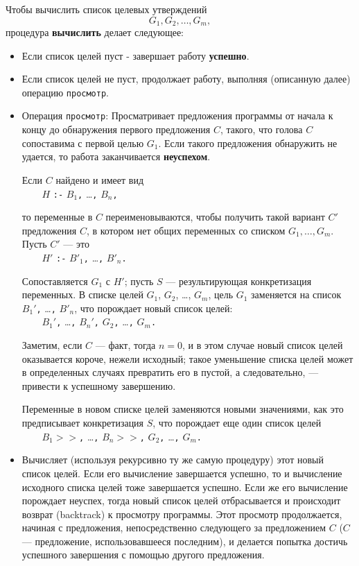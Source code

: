 \documentclass[12pt, openany, twoside]{book} %
\begin{document}
Чтобы вычислить список целевых утверждений
$$
    G_1, G_2, \ldots, G_m,
$$
процедура \textbf{вычислить} делает следующее:
\begin{itemize}
  \item Если список целей пуст - завершает работу \textbf{успешно}.
  \item Если список целей не пуст, продолжает работу, выполняя (описанную далее) операцию {\tt просмотр}.
  \item Операция \texttt{просмотр}: Просматривает предложения программы от начала к концу до обнаружения первого предложения $C$, такого, что голова $C$ сопоставима с первой целью $G_1$. Если такого предложения обнаружить не удается, то работа заканчивается \textbf{неуспехом}.

\noindent Если $C$ найдено и имеет вид\\[1ex]
\verb|    |$H$ {\tt :-} $B_1${\tt,} \ldots{\tt,} $B_n${\tt,}

\noindent то переменные в $C$ переименовываются, чтобы получить такой вариант $C'$ предложения $C$, в котором нет общих переменных со списком $G_1, \ldots, G_m$. Пусть $C'$ --- это\\[1ex]
\verb|    |$H'$ {\tt :-} $B'_1${\tt,} \ldots{\tt,} $B'_n${\tt.}

\noindent Сопоставляется $G_1$ с $H'$; пусть $S$ --- результирующая конкретизация переменных. В списке целей $G_1$, $G_2$, \ldots, $G_m$, цель $G_1$ заменяется на список $B_1'${\tt,} \ldots{\tt,} $B'_n$, что порождает новый список
целей:\\[1ex]
\verb|    |$B_1'${\tt ,} \ldots{\tt,} $B_n'${\tt,} $G_2${\tt,}
    \ldots{\tt,} $G_m${\tt.}

\noindent Заметим, если $C$ --- факт, тогда $n = 0$, и в этом случае
новый список целей оказывается короче, нежели исходный; такое уменьшение списка целей может в определенных случаях превратить его в пустой, а следовательно, --- привести к успешному завершению.

\noindent Переменные в новом списке целей заменяются новыми значениями, как
это предписывает конкретизация $S$, что порождает еще один список целей\\[1ex]
\verb|    |$B_1>>${\tt ,} \ldots{\tt,} $B_n>>${\tt,} $G_2${\tt,}
    \ldots{\tt,} $G_m${\tt.}

  \item Вычисляет (используя рекурсивно ту же самую процедуру) этот новый список целей. Если его вычисление завершается успешно, то и вычисление исходного списка целей тоже завершается успешно. Если же его вычисление порождает неуспех, тогда новый список целей отбрасывается и происходит возврат (backtrack) к просмотру программы. Этот просмотр продолжается, начиная с предложения, непосредственно следующего за предложением $C$ ($C$ --- предложение, использовавшееся последним), и делается попытка достичь успешного завершения с помощью другого предложения.
\end{itemize}
\end{document}
